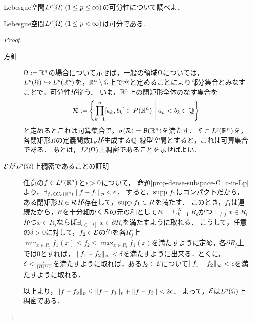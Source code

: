 \documentclass[uplatex,dvipdfmx]{jsarticle}
\begin{document}
\begin{tcolorbox}[colframe=ForestGreen, colback=ForestGreen!10!white,breakable,colbacktitle=ForestGreen!40!white,coltitle=black,fonttitle=\bfseries\sffamily,
title=]
    Lebesgue空間$L^p(\Omega)\;(1\le p\le\infty)$の可分性について調べよ．
\end{tcolorbox}

\begin{theorem}
    Lebesgue空間$L^p(\Omega)\;(1\le p<\infty)$は可分である．
\end{theorem}
\begin{proof}\mbox{}
    \begin{description}
        \item[方針] $\Omega:=\mathbb{R}^n$の場合について示せば，一般の領域$\Omega$については，$L^p(\Omega)\hookrightarrow L^p(\mathbb{R}^n)$を，$\mathbb{R}^n\setminus\Omega$上で零と定めることにより部分集合とみなすことで，可分性が従う．
        いま，$\mathbb{R}^n$上の閉矩形全体のなす集合を
        \[\mathcal{R}:=\left\{\prod_{k=1}^n[a_k,b_k]\in P(\mathbb{R}^n)\;\middle|\;a_k< b_k\in\mathbb{Q}\right\}\]
        と定めるとこれは可算集合で，$\sigma(\mathcal{R})=\mathcal{B}(\mathbb{R}^n)$を満たす．
        $\mathcal{E}\subset L^p(\mathbb{R}^n)$を，各閉矩形$R$の定義関数$1_R$が生成する$\mathbb{Q}$-線型空間とすると，これは可算集合である．
        あとは，$L^p(\Omega)$上稠密であることを示せばよい．
        \item[$\mathcal{E}$が$L^p(\Omega)$上稠密であることの証明] 任意の$f\in L^p(\mathbb{R}^n)$と$\epsilon>0$について，
        命題\ref{prop-dense-subspace-C_c-in-Lp}より，$\exists_{f_1\in C_c(\mathbb{R}^n)}\;\|f-f_1\|_p<\epsilon$．
        すると，$\mathrm{supp}\; f_1$はコンパクトだから，ある閉矩形$R\in\mathcal{R}$が存在して，$\mathrm{supp}\; f_1\subset R$を満たす．
        このとき，$f_1$は連続だから，$R$を十分細かく$\mathcal{R}$の元の和として$R=\cup_{k=1}^NR_d$かつ$\exists_{i\ne j}\;x\in R_i$かつ$x\in R_j$ならば$\exists_{i\in[d]}\;x\in\partial R_i$を満たすように取れる．
        こうして，任意の$\delta>0$に対して，$f_2\in\mathcal{E}$の値を各$R_j^\circ$上$\min_{x\in R_j}f_1(x)\le f_2\le\max_{x\in R_j}f_1(x)$を満たすように定め，各$\partial R_j$上では$0$とすれば，
        $\|f_1-f_2\|_\infty<\delta$を満たすように出来る．とくに，$\delta<\frac{\epsilon}{\lvert R\rvert^{1/p}}$を満たすように取れば，ある$f_2\in\mathcal{E}$について$\|f_1-f_2\|_\infty<\epsilon$を満たすように取れる．

        以上より，$\|f-f_2\|_p\le\|f-f_1\|_p+\|f-f_2\|<2\epsilon$．
        よって，$\mathcal{E}$は$L^p(\Omega)$上稠密である．
    \end{description}
\end{proof}
\end{document}
